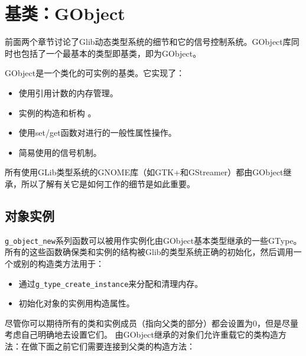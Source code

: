 \chapter{基类：GObject}
前面两个章节讨论了Glib动态类型系统的细节和它的信号控制系统。GObject库同时也包括了一个最基本的类型即基类，即为GObject。

GObject是一个类化的可实例的基类。它实现了：
\begin{itemize}
	\item 使用引用计数的内存管理。
	\item 实例的构造和析构 。
	\item 使用set/get函数对进行的一般性属性操作。
	\item 简易使用的信号机制。
\end{itemize}
所有使用GLib类型系统的GNOME库（如GTK+和GStreamer）都由GObject继承，所以了解有关它是如何工作的细节是如此重要。

\section{对象实例}
\verb|g_object_new|系列函数可以被用作实例化由GObject基本类型继承的一些GType。所有的这些函数确保类和实例的结构被Glib的类型系统正确的初始化，然后调用一个或别的构造类方法用于：

\begin{itemize}
	\item 通过\verb|g_type_create_instance|来分配和清理内存。
	\item 初始化对象的实例用构造属性。
\end{itemize}

尽管你可以期待所有的类和实例成员（指向父类的部分）都会设置为0，但是尽量考虑自己明确地去设置它们。
由GObject继承的对象们允许重载它的类构造方法：在做下面之前它们需要连接到父类的构造方法：


